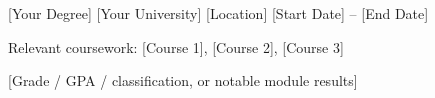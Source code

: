 

\begin{cventries}

  \cventry
    {[Your Degree]} %
    {[Your University]} %
    {[Location]} %
    {[Start Date] -- [End Date]} %
    {
      \begin{cvitems}
        \item {Relevant coursework: [Course 1], [Course 2], [Course 3]}
        \item {[Grade / GPA / classification, or notable module results]}
      \end{cvitems}
    }

\end{cventries}
